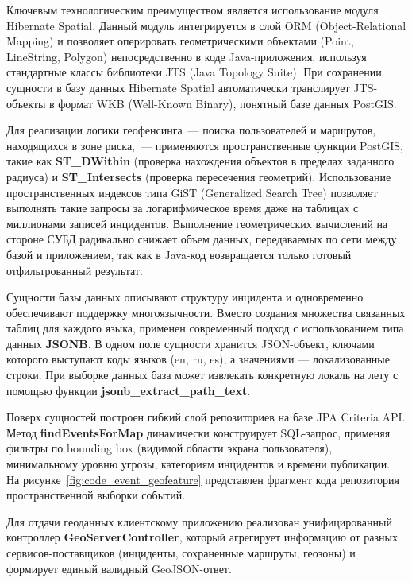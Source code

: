 Ключевым технологическим преимуществом является использование модуля Hibernate Spatial. Данный модуль интегрируется в слой ORM (Object-Relational Mapping) и позволяет оперировать геометрическими объектами (Point, LineString, Polygon) непосредственно в коде Java-приложения, используя стандартные классы библиотеки JTS (Java Topology Suite). При сохранении сущности в базу данных Hibernate Spatial автоматически транслирует JTS-объекты в формат WKB (Well-Known Binary), понятный базе данных PostGIS.

Для реализации логики геофенсинга~--- поиска пользователей и маршрутов, находящихся в зоне риска,~--- применяются пространственные функции PostGIS, такие как \textbf{ST\_DWithin} (проверка нахождения объектов в пределах заданного радиуса) и \textbf{ST\_Intersects} (проверка пересечения геометрий). Использование пространственных индексов типа GiST (Generalized Search Tree) позволяет выполнять такие запросы за логарифмическое время даже на таблицах с миллионами записей инцидентов. Выполнение геометрических вычислений на стороне СУБД радикально снижает объем данных, передаваемых по сети между базой и приложением, так как в Java-код возвращается только готовый отфильтрованный результат.

Сущности базы данных описывают структуру инцидента и одновременно обеспечивают поддержку многоязычности. Вместо создания множества связанных таблиц для каждого языка, применен современный подход с использованием типа данных \textbf{JSONB}. В одном поле сущности хранится JSON-объект, ключами которого выступают коды языков (en, ru, es), а значениями — локализованные строки. При выборке данных база может извлекать конкретную локаль на лету с помощью функции \textbf{jsonb\_extract\_path\_text}.

Поверх сущностей построен гибкий слой репозиториев на базе JPA Criteria API. Метод \textbf{findEventsForMap} динамически конструирует SQL-запрос, применяя фильтры по bounding box (видимой области экрана пользователя), минимальному уровню угрозы, категориям инцидентов и времени публикации. На рисунке~\ref{fig:code_event_geofeature} представлен фрагмент кода репозитория пространственной выборки событий.


Для отдачи геоданных клиентскому приложению реализован унифицированный контроллер \textbf{GeoServerController}, который агрегирует информацию от разных сервисов-поставщиков (инциденты, сохраненные маршруты, геозоны) и формирует единый валидный GeoJSON-ответ. 

